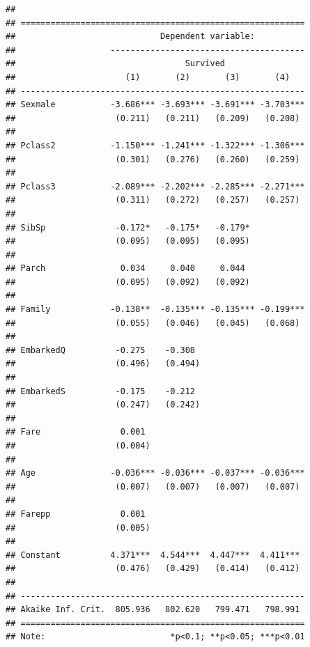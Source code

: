 \documentclass[
]{article}
\begin{document}
\begin{verbatim}
## 
## =========================================================
##                             Dependent variable:          
##                   ---------------------------------------
##                                  Survived                
##                      (1)       (2)       (3)       (4)   
## ---------------------------------------------------------
## Sexmale           -3.686*** -3.693*** -3.691*** -3.703***
##                    (0.211)   (0.211)   (0.209)   (0.208) 
##                                                          
## Pclass2           -1.150*** -1.241*** -1.322*** -1.306***
##                    (0.301)   (0.276)   (0.260)   (0.259) 
##                                                          
## Pclass3           -2.089*** -2.202*** -2.285*** -2.271***
##                    (0.311)   (0.272)   (0.257)   (0.257) 
##                                                          
## SibSp              -0.172*   -0.175*   -0.179*           
##                    (0.095)   (0.095)   (0.095)           
##                                                          
## Parch               0.034     0.040     0.044            
##                    (0.095)   (0.092)   (0.092)           
##                                                          
## Family            -0.138**  -0.135*** -0.135*** -0.199***
##                    (0.055)   (0.046)   (0.045)   (0.068) 
##                                                          
## EmbarkedQ          -0.275    -0.308                      
##                    (0.496)   (0.494)                     
##                                                          
## EmbarkedS          -0.175    -0.212                      
##                    (0.247)   (0.242)                     
##                                                          
## Fare                0.001                                
##                    (0.004)                               
##                                                          
## Age               -0.036*** -0.036*** -0.037*** -0.036***
##                    (0.007)   (0.007)   (0.007)   (0.007) 
##                                                          
## Farepp              0.001                                
##                    (0.005)                               
##                                                          
## Constant          4.371***  4.544***  4.447***  4.411*** 
##                    (0.476)   (0.429)   (0.414)   (0.412) 
##                                                          
## ---------------------------------------------------------
## Akaike Inf. Crit.  805.936   802.620   799.471   798.991 
## =========================================================
## Note:                         *p<0.1; **p<0.05; ***p<0.01
\end{verbatim}
\end{document}
